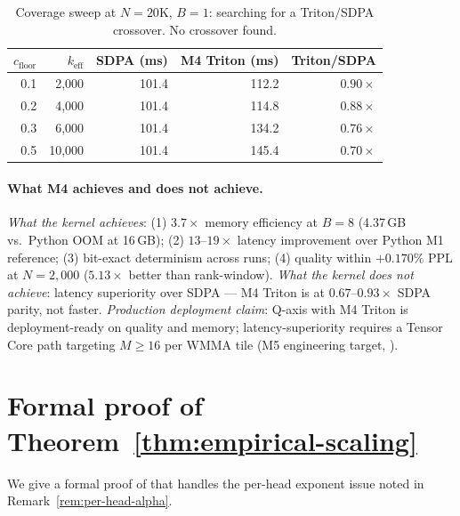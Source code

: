 \documentclass[11pt]{article}
\theoremstyle{definition}
\theoremstyle{remark}
\theoremstyle{plain}
\begin{document}
\begin{table}[h]
  \centering\small
  \caption{Coverage sweep at $N\!=\!20\text{K}$, $B\!=\!1$: searching for a
    Triton$/$SDPA crossover. No crossover found.}
  \label{tab:cov_sweep}
  \begin{tabular}{rrrrr}
    \toprule
    $c_\text{floor}$ & $k_\text{eff}$ & SDPA (ms) & M4 Triton (ms) & Triton/SDPA \\
    \midrule
    0.1 & 2{,}000  & 101.4 & 112.2 & $0.90\times$ \\
    0.2 & 4{,}000  & 101.4 & 114.8 & $0.88\times$ \\
    0.3 & 6{,}000  & 101.4 & 134.2 & $0.76\times$ \\
    0.5 & 10{,}000 & 101.4 & 145.4 & $0.70\times$ \\
    \bottomrule
  \end{tabular}
\end{table}

\paragraph{What M4 achieves and does not achieve.}
\emph{What the kernel achieves}: (1) $3.7\times$ memory efficiency at $B\!=\!8$
(4.37\,GB vs.\ Python OOM at 16\,GB); (2) $13$--$19\times$ latency improvement
over Python M1 reference; (3) bit-exact determinism across runs; (4) quality
within $+0.170\%$ PPL at $N\!=\!2{,}000$ ($5.13\times$ better than rank-window).
\emph{What the kernel does not achieve}: latency superiority over SDPA --- M4 Triton
is at $0.67$--$0.93\times$ SDPA parity, not faster.
\emph{Production deployment claim}: Q-axis with M4 Triton is deployment-ready on
quality and memory; latency-superiority requires a Tensor Core path targeting
$M\!\geq\!16$ per WMMA tile (M5 engineering target, ).


\appendix
\section{Formal proof of Theorem~\ref{thm:empirical-scaling}}\label{app:thm3}

We give a formal proof of  that handles the per-head exponent
issue noted in Remark~\ref{rem:per-head-alpha}.
\end{document}
